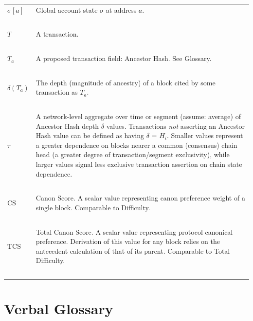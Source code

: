 \documentclass[11pt]{article}
\theoremstyle{plain}
\begin{document}
\begin{table}[H]
{\begin{tabular}{|p{5cm}|p{9cm}|}
$\sigma[a]$ & Global account state $\sigma$ at address $a$. \\~\\

$T$ & A transaction. \\~\\

$T_a$ & A proposed transaction field: Ancestor Hash.
See Glossary. \\~\\

$\delta(T_a)$ & The depth (magnitude of ancestry) of a block cited by some
transaction as $T_a$. \\~\\

$\tau$ & A network-level aggregate over time or segment (assume: average) of
Ancestor Hash depth $\delta$ values. Transactions \textit{not} asserting an
Ancestor Hash value can be defined as having $\delta$ = $H_i$.
Smaller values represent a greater dependence on blocks nearer a common
(consensus) chain head (a greater degree of transaction/segment exclusivity),
while larger values signal less exclusive transaction assertion on chain
state dependence.
\\~\\

$\mathrm{CS}$ & Canon Score. A scalar value representing canon preference
weight of a single block. Comparable to Difficulty. \\~\\

$\mathrm{TCS}$ & Total Canon Score. A scalar value representing protocol
canonical preference. Derivation of this value for any block relies on the
antecedent calculation of that of its parent. Comparable to Total Difficulty.
\\~\\

\hline
\end{tabular}
}
\end{table}


\section{\normalsize{Verbal Glossary}}\label{sec: glossary}
\end{document}

